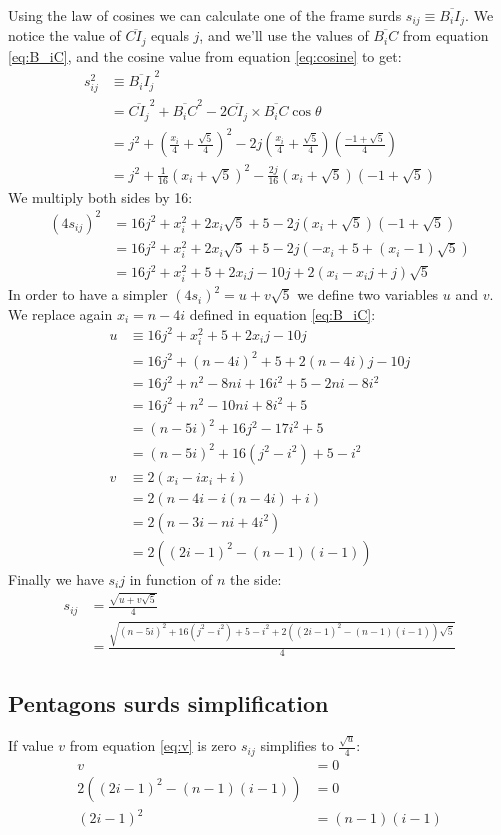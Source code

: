 \documentclass[11pt]{article}
\begin{document}
Using the law of cosines we can calculate one of the frame surds $s_{ij} \equiv \overline{B_iI_j}$.
We notice the value of $\overline{CI_j}$ equals $j$, and we'll use the values of $\overline{B_iC}$ from equation \ref{eq:B_iC}, and the cosine value from equation \ref{eq:cosine} to get:
\begin{align}
s_{ij}^2 &\equiv \overline{B_iI_j}^2 \\
 &= \overline{CI_j}^2 + \overline{B_iC}^2 
 - 2\overline{CI_j}\times\overline{B_iC}\cos\theta  \nonumber\\
 &= j^2 + \left(\frac{x_i}{4} + \frac{\sqrt{5}}{4}\right)^2
 - 2j\left(\frac{x_i}{4} + \frac{\sqrt{5}}{4}\right)\left(\frac{-1+\sqrt{5}}{4}\right) \\
 &= j^2 + \frac{1}{16}\left(x_i + \sqrt{5}\right)^2
 - \frac{2j}{16}\left(x_i + \sqrt{5}\right)\left(-1+\sqrt{5}\right)
\end{align}   
We multiply both sides by 16:   
\begin{align}
(4s_{ij})^2 &= 16j^2 + x_i^2 + 2x_i\sqrt{5} + 5
 - 2j\left(x_i + \sqrt{5}\right)\left(-1+\sqrt{5}\right) \\
 &= 16j^2 + x_i^2 + 2x_i\sqrt{5} + 5 - 2j(-x_i + 5 + (x_i-1)\sqrt{5}) \\
 &= 16j^2 + x_i^2 + 5 + 2x_ij - 10j + 2(x_i - x_ij + j)\sqrt{5}
\end{align}
In order to have a simpler $(4s_i)^2 = u+v\sqrt{5}$ we define two variables $u$ and $v$.
We replace again $x_i = n - 4i$ defined in equation \ref{eq:B_iC}:
\begin{align}
u &\equiv 16j^2 + x_i^2 + 5 + 2x_ij - 10j \nonumber\\
 &= 16j^2 + (n - 4i)^2 + 5 + 2(n - 4i)j - 10j \nonumber\\
 &= 16j^2 + n^2 - 8ni + 16i^2 + 5 - 2ni - 8i^2 \nonumber\\
 &= 16j^2 + n^2 - 10ni + 8i^2 + 5 \nonumber\\
 &= (n - 5i)^2 + 16j^2 - 17i^2 + 5 \nonumber\\
 &= (n - 5i)^2 + 16(j^2-i^2) + 5 - i^2 \label{eq:u} \\
v &\equiv 2(x_i - ix_i + i) \nonumber\\
 &= 2(n-4i - i(n-4i) + i) \nonumber\\
 &= 2(n-3i - ni + 4i^2) \nonumber\\
 &= 2((2i-1)^2 - (n-1)(i-1)) \label{eq:v} 
\end{align}
Finally we have $s_ij$ in function of $n$ the side:
\begin{align}
s_{ij} &= \frac{\sqrt{u+v\sqrt{5}}}{4} \nonumber\\
 &= \frac{\sqrt{(n - 5i)^2 + 16(j^2-i^2) + 5 - i^2 + 2((2i-1)^2 - (n-1)(i-1))\sqrt{5}}}{4}
\end{align}

\subsection{Pentagons surds simplification}

If value $v$ from equation \ref{eq:v} is zero $s_{ij}$ simplifies to $\frac{\sqrt{u}}{4}$:
\begin{align}
v &= 0 \nonumber\\
2((2i-1)^2 - (n-1)(i-1)) &= 0 \nonumber\\
(2i-1)^2 &= (n-1)(i-1)
\end{align}
\end{document}
